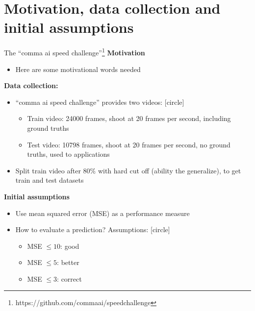 \section{Motivation, data collection and initial assumptions}

\begin{frame}{The \enquote{comma ai speed challenge}\footnote{https://github.com/commaai/speedchallenge}}
\textbf{Motivation}
\begin{itemize}
\item<+-> Here are some motivational words needed
\end{itemize}
\textbf{Data collection:}
\begin{itemize}
\item \enquote{comma ai speed challenge} provides two videos:
[circle]
\begin{itemize}
\item Train video: 24000 frames, shoot at 20 frames per second, including ground truths
\item Test video: 10798 frames, shoot at 20 frames per second, no ground truths, used to applications
\end{itemize}
\item Split train video after 80$\%$ with hard cut off (ability the generalize), to get train and test datasets
\end{itemize}
\textbf{Initial assumptions}
\begin{itemize}
\item<+-> Use mean squared error (MSE) as a performance measure
\item<+-> How to evaluate a prediction? Assumptions:
[circle]
\begin{itemize}
\item MSE $\leq 10$: good
\item MSE $\leq 5$: better
\item MSE $\leq 3$: correct
\end{itemize}
\end{itemize}

\end{frame}
